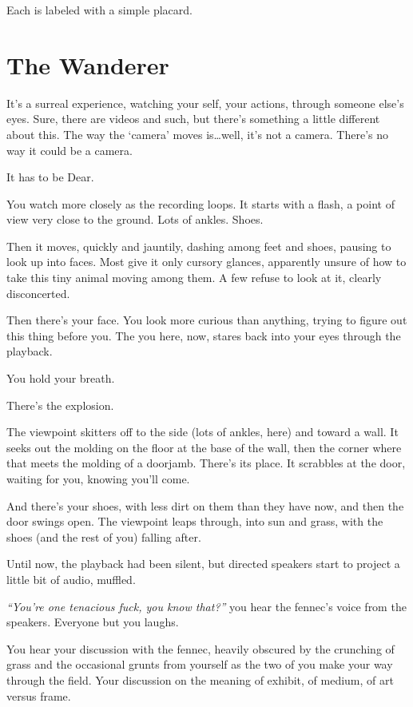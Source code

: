 Each is labeled with a simple placard.

\newpage
\section*{The Wanderer}

It's a surreal experience, watching your self, your actions, through someone else's eyes. Sure, there are videos and such, but there's something a little different about this. The way the `camera' moves is\ldots{}well, it's not a camera. There's no way it could be a camera.

It has to be Dear.

You watch more closely as the recording loops. It starts with a flash, a point of view very close to the ground. Lots of ankles. Shoes.

Then it moves, quickly and jauntily, dashing among feet and shoes, pausing to look up into faces. Most give it only cursory glances, apparently unsure of how to take this tiny animal moving among them. A few refuse to look at it, clearly disconcerted.

Then there's your face. You look more curious than anything, trying to figure out this thing before you. The you here, now, stares back into your eyes through the playback.

You hold your breath.

There's the explosion.

The viewpoint skitters off to the side (lots of ankles, here) and toward a wall. It seeks out the molding on the floor at the base of the wall, then the corner where that meets the molding of a doorjamb. There's its place. It scrabbles at the door, waiting for you, knowing you'll come.

And there's your shoes, with less dirt on them than they have now, and then the door swings open. The viewpoint leaps through, into sun and grass, with the shoes (and the rest of you) falling after.

Until now, the playback had been silent, but directed speakers start to project a little bit of audio, muffled.

\emph{``You're one tenacious fuck, you know that?''} you hear the fennec's voice from the speakers. Everyone but you laughs.

You hear your discussion with the fennec, heavily obscured by the crunching of grass and the occasional grunts from yourself as the two of you make your way through the field. Your discussion on the meaning of exhibit, of medium, of art versus frame.

